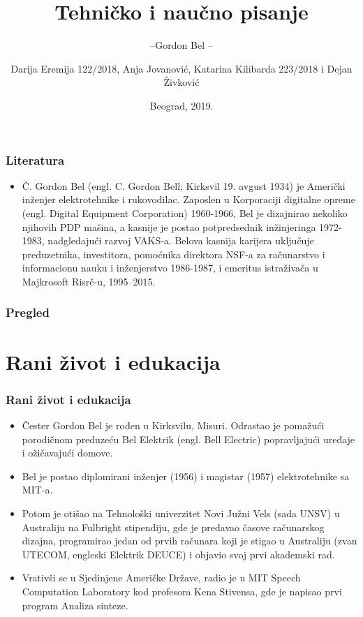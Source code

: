 \documentclass{beamer}
\begin{document}
\title{Tehničko i naučno pisanje}
\subtitle{--Gordon Bel --}
\author{Darija Eremija 122/2018, Anja Jovanović, Katarina Kilibarda 223/2018 i Dejan Živković}
\date{
	\footnotesize{Beograd, 2019.}	
}

\begin{frame}
	\thispagestyle{empty}
	\titlepage
\end{frame}

\addtocounter{framenumber}{-1}

\begin{frame}[fragile]\frametitle{Literatura}
	\begin{itemize}
		\item 
		Č. Gordon Bel (engl. C. Gordon Bell; Kirksvil 19. avgust 1934) je Američki inženjer elektrotehnike i rukovodilac. Zaposlen u Korporaciji digitalne opreme (engl. Digital Equipment Corporation) 1960-1966, Bel je dizajnirao nekoliko njihovih PDP mašina, a kasnije je postao potpredsednik inžinjeringa 1972-1983, nadgledajući razvoj VAKS-a.  Belova kasnija karijera uključuje preduzetnika, investitora, pomoćnika direktora NSF-a za računarstvo i informacionu nauku i inženjerstvo 1986-1987, i emeritus istraživača u Majkrosoft Risrč-u, 1995–2015.
	\end{itemize}
\end{frame}

\begin{frame}
	\frametitle{Pregled} %
	\tableofcontents[hidesubsections] 
\end{frame}

\section{Rani život i edukacija}

\begin{frame}[fragile]\frametitle{Rani život i edukacija}
	\begin{itemize}	
		\item Čester Gordon Bel je rođen u Kirksvilu, Misuri. Odrastao je pomažući porodičnom preduzeću Bel Elektrik (engl. Bell Electric) popravljajući uređaje i ožičavajući domove.
		\item Bel je postao diplomirani inženjer (1956) i magistar (1957) elektrotehnike sa MIT-a.
		\item Potom je otišao na Tehnološki univerzitet Novi Južni Vels (sada UNSV) u Australiju na Fulbright stipendiju, gde je predavao časove računarskog dizajna, programirao jedan od prvih računara koji je stigao u Australiju (zvan UTECOM, engleski Elektrik DEUCE) i objavio svoj prvi akademski rad.
		\item Vrativši se u Sjedinjene Američke Države, radio je u MIT Speech Computation Laboratory kod profesora Kena Stivensa, gde je napisao prvi program Analiza sinteze.
	\end{itemize}
\end{frame}
\end{document}
